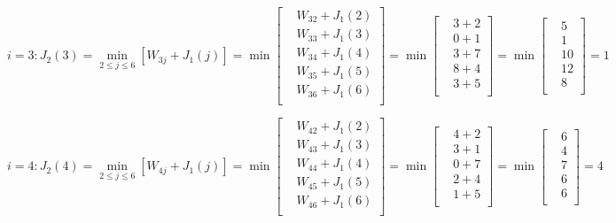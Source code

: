 \documentclass[UTF8]{ctexart}
\begin{document}
\begin{equation*}
    i=3:
    J_2(3)=\min_{2\leq j\leq6}[W_{3j}+J_1(j)]=\min
    \left[
    \begin{aligned}
        &W_{32}+J_1(2) \\
        &W_{33}+J_1(3) \\
        &W_{34}+J_1(4) \\
        &W_{35}+J_1(5) \\
        &W_{36}+J_1(6) \\
    \end{aligned}
    \right]
    =\min
    \left[
    \begin{aligned}
        &3+2 \\
        &0+1 \\
        &3+7 \\
        &8+4 \\
        &3+5 \\
    \end{aligned}
    \right]
    =\min
    \left[
    \begin{aligned}
        &5 \\
        &1 \\
        &10 \\
        &12 \\
        &8 \\
    \end{aligned}
    \right]
    =1
\end{equation*}

\begin{equation*}
    i=4:
    J_2(4)=\min_{2\leq j\leq6}[W_{4j}+J_1(j)]=\min
    \left[
    \begin{aligned}
        &W_{42}+J_1(2) \\
        &W_{43}+J_1(3) \\
        &W_{44}+J_1(4) \\
        &W_{45}+J_1(5) \\
        &W_{46}+J_1(6) \\
    \end{aligned}
    \right]
    =\min
    \left[
    \begin{aligned}
        &4+2 \\
        &3+1 \\
        &0+7 \\
        &2+4 \\
        &1+5 \\
    \end{aligned}
    \right]
    =\min
    \left[
    \begin{aligned}
        &6 \\
        &4 \\
        &7 \\
        &6 \\
        &6 \\
    \end{aligned}
    \right]
    =4
\end{equation*}
\end{document}
